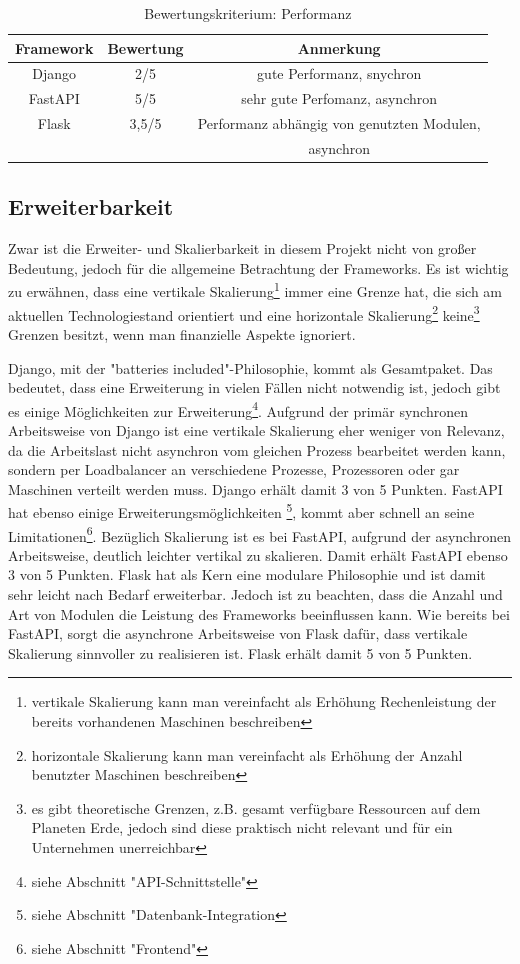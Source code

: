 \documentclass[letterpaper,11pt,leqno]{article}
\begin{document}
\begin{table}[h!]
	\begin{center}
		\begin{tabular}{|c||c|c|}
			\hline
			Framework & Bewertung & Anmerkung\\
			\hline\hline
			Django & 2/5 & gute Performanz, snychron\\
			FastAPI & 5/5 & sehr gute Perfomanz, asynchron\\
			Flask & 3,5/5 & Performanz abhängig von genutzten Modulen,\\
			& & asynchron\\
			\hline
		\end{tabular}
		\caption{Bewertungskriterium: Performanz}
	\end{center}
	\label{table:8}
\end{table}

\subsection{Erweiterbarkeit}
Zwar ist die Erweiter- und Skalierbarkeit in diesem Projekt nicht von großer Bedeutung, jedoch für
die allgemeine Betrachtung der Frameworks. Es ist wichtig zu erwähnen, dass eine vertikale
Skalierung\footnote{vertikale Skalierung kann man vereinfacht als Erhöhung Rechenleistung der
bereits vorhandenen Maschinen beschreiben} immer eine Grenze hat, die sich am aktuellen
Technologiestand orientiert und eine horizontale Skalierung\footnote{horizontale Skalierung kann man
vereinfacht als Erhöhung der Anzahl benutzter Maschinen beschreiben} keine\footnote{es gibt
theoretische Grenzen, z.B. gesamt verfügbare Ressourcen auf dem Planeten Erde, jedoch sind diese
praktisch nicht relevant und für ein Unternehmen unerreichbar} Grenzen besitzt, wenn man finanzielle
Aspekte ignoriert.

Django, mit der "batteries included"-Philosophie, kommt als Gesamtpaket. Das bedeutet, dass eine
Erweiterung in vielen Fällen nicht notwendig ist, jedoch gibt es einige Möglichkeiten zur
Erweiterung\footnote{siehe Abschnitt "API-Schnittstelle"}. Aufgrund der primär synchronen
Arbeitsweise von Django ist eine vertikale Skalierung eher weniger von Relevanz, da die Arbeitslast
nicht asynchron vom gleichen Prozess bearbeitet werden kann, sondern per Loadbalancer an
verschiedene Prozesse, Prozessoren oder gar Maschinen verteilt werden muss. Django erhält damit
3 von 5 Punkten. FastAPI hat ebenso einige Erweiterungsmöglichkeiten \footnote{siehe Abschnitt
"Datenbank-Integration}, kommt aber schnell an seine Limitationen\footnote{siehe Abschnitt
"Frontend"}. Bezüglich Skalierung ist es bei FastAPI, aufgrund der asynchronen Arbeitsweise,
deutlich leichter vertikal zu skalieren. Damit erhält FastAPI ebenso 3 von 5 Punkten. Flask hat als
Kern eine modulare Philosophie und ist damit sehr leicht nach Bedarf erweiterbar. Jedoch ist zu
beachten, dass die Anzahl und Art von Modulen die Leistung des Frameworks beeinflussen kann. Wie
bereits bei FastAPI, sorgt die asynchrone Arbeitsweise von Flask dafür, dass vertikale Skalierung
sinnvoller zu realisieren ist. Flask erhält damit 5 von 5 Punkten.
\end{document}
